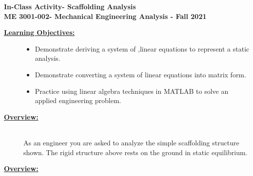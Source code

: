 \documentclass[12pt]{article}
\newcommand{\COURNAME}{ME 3001-002}
\newcommand{\CURRTERM}{Fall 2021} %
\newcommand{\ANUM}{6} %
\newcommand{\activitytitle}{Scaffolding Analysis} %
\begin{document}
\thispagestyle{plain}

\begin{center}
   {\bf \Large In-Class Activity\hspc\ANUM\hspc - \activitytitle}\vspace{3mm}\\
   {\bf \large \COURNAME - Mechanical Engineering Analysis - \CURRTERM} \vspace{5mm}\\
\end{center}

\begin{description}


\item[\textbf{\underline{Learning Objectives:}}] \hfill \vspace{0mm}

\begin{itemize}
	\item Demonstrate deriving a system of ,linear equations to represent a static analysis.
	\item Demonstrate converting a system of linear equations into matrix form.
	\item Practice using linear algebra techniques in MATLAB to solve an applied engineering problem.
\end{itemize}


\item[\textbf{\underline{Overview:}}] \hfill \vspace{3mm}\\

As an engineer you are asked to analyze the simple scaffolding structure shown. The rigid structure above rests on the ground in static equilibrium. 

\item[\textbf{\underline{Overview:}}] \hfill \vspace{3mm}\\
	
	
	

\end{description}
\end{document}
